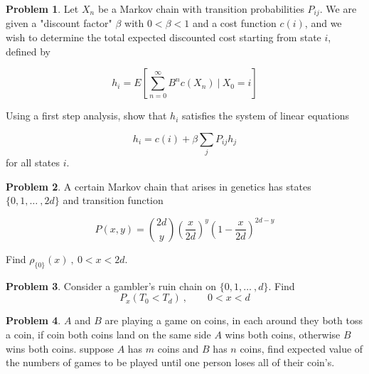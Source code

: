 \documentclass[12pt]{extreport}
\theoremstyle{definition}
\newtheorem{prob}{Problem}
\begin{document}
    \begin{prob}
         Let \(X_n\) be a Markov chain with transition probabilities \(P_{ij}\). We are given a "discount factor" \(\beta\) with \(0 < \beta < 1\) and a cost function \(c(i)\), and we wish to determine the total expected discounted cost starting from state \(i\), defined by

        \[h_i = E\left[\sum_{n=0}^{\infty} B^n c(X_n) \ | \ X_0 = i\right] \]

        Using a first step analysis, show that \(h_i\) satisfies the system of linear equations

        \[h_i = c(i) + \beta \sum_j P_{ij} h_j\] 
        for all states \(i\).
    \end{prob}

    \begin{prob}
        A certain Markov chain that arises in genetics has states \(\{0, 1, \dots\ , 2d\}\) and transition function

        \[P(x,y) = \binom{2d}{y}\left(\frac{x}{2d}\right)^y\left(1 - \frac{x}{2d}\right)^{2d-y}\]

        Find \(\rho_{\{0\}}(x) \ , \ 0 < x < 2d\).
    \end{prob}
    \begin{prob}
        Consider a gambler's ruin chain on \(\{0, 1, \dots\ , d\}\). Find \[P_x\left(T_0 < T_d\right) \ , \qquad  0 < x < d\]
    \end{prob}

    \begin{prob}
        $A$ and $B$ are playing a game on coins, in each around they both toss a coin, if coin both coins land on the same side $A$ wins both coins, otherwise $B$ wins both coins. suppose $A$ has $m$ coins and $B$ has $n$ coins, find expected value of the numbers of games to be played until one person loses all of their coin's. 
    \end{prob}
\end{document}
